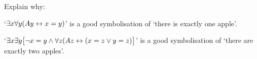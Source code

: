 \practiceproblems




\problempart Explain why:
	\begin{ebullet}
		\item   `$\exists x \forall y(Ay \leftrightarrow x= y)$' is a good symbolisation of `there is exactly one apple'.
		\item `$\exists x \exists y \bigl[\neg x = y \wedge \forall z(Az \leftrightarrow (x= z \vee y = z)\bigr]$' is a good symbolisation of `there are exactly two apples'.
	\end{ebullet}		


